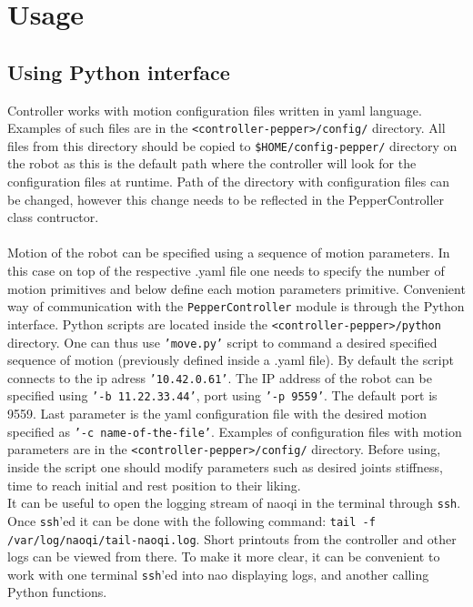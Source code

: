 \section{Usage}

\subsection{Using Python interface}
\noindent Controller works with motion configuration files written in yaml language. Examples of such files are in the
\texttt{<controller-pepper>/config/} directory. All files from this directory should be copied to
\texttt{\$HOME/config-pepper/} directory on the robot as this is the default path where the controller will look for the configuration files 
at runtime. Path of the directory with configuration files can be changed, however this change needs to be reflected in
the PepperController class contructor.\\ \\
\noindent Motion of the robot can be specified using a sequence of motion parameters. In this case on top of the
respective .yaml file one needs to specify the number of motion primitives and below define each motion parameters
primitive.
\noindent Convenient way of communication with the \texttt{PepperController} module is through the Python interface. Python scripts are located
inside the \texttt{<controller-pepper>/python} directory. One can thus use \texttt{'move.py'} script to command a desired specified
sequence of motion (previously defined inside a .yaml file). By default the script connects to the ip adress
\texttt{'10.42.0.61'}. The IP address of the robot can be specified using \texttt{'-b 11.22.33.44'}, port using
\texttt{'-p 9559'}. The default port is 9559. Last parameter is the yaml configuration file with the desired motion specified as 
\texttt{'-c name-of-the-file'}. Examples of configuration files with motion parameters are in the
\texttt{<controller-pepper>/config/} directory. Before using, inside the script one should modify parameters such as desired joints stiffness,
time to reach initial and rest position to their liking.\\

\noindent It can be useful to open the logging stream of naoqi in the terminal through \texttt{ssh}. Once
\texttt{ssh}'ed it can be done with the following command: \texttt{tail -f /var/log/naoqi/tail-naoqi.log}.
Short printouts from the controller and other logs can be viewed from there. To make it more clear, it can be convenient
to work with one terminal \texttt{ssh}'ed into nao displaying logs, and another calling Python functions.\\

